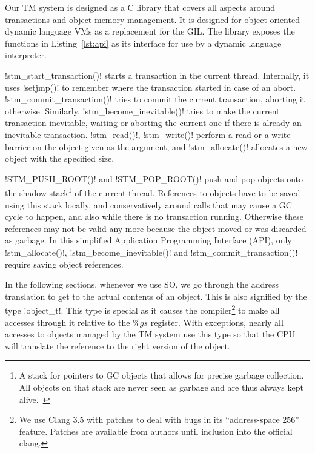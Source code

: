 \documentclass{sigplanconf}
\makeatletter
\renewcommand\lstinline[1][]{%
  \Collectverb{\@@myverb}%
}
\def\@@myverb#1{%
    \begingroup
    \fboxsep=0.2em
    \colorbox{verylightgray}{\oldlstinline|#1|}%
    \endgroup
}
\makeatother
\begin{document}
Our TM system is designed as a C library that covers all aspects around
transactions and object memory management. It is designed for
object-oriented dynamic language VMs as a replacement for the GIL.
The library exposes the functions in Listing~\ref{lst:api} as its
interface for use by a dynamic language interpreter.

\lstinline!stm_start_transaction()!  starts a transaction in the
current thread. Internally, it uses \lstinline!setjmp()! to remember
where the transaction started in case of an abort.
\lstinline!stm_commit_transaction()! tries to commit the current
transaction, aborting it otherwise. Similarly,
\lstinline!stm_become_inevitable()!  tries to make the current
transaction inevitable, waiting or aborting the current one if there
is already an inevitable transaction.
 \lstinline!stm_read()!, \lstinline!stm_write()!  perform
a read or a write barrier on the object given as the argument, and
\lstinline!stm_allocate()!  allocates a new object with the specified
size.

\lstinline!STM_PUSH_ROOT()! and \lstinline!STM_POP_ROOT()!
push and pop objects onto the shadow stack\footnote{A stack for pointers
  to GC objects that allows for precise garbage collection. All objects
  on that stack are never seen as garbage and are thus always kept
  alive.~\cite{fergus02}} of the current thread.  References to objects
have to be saved using this stack locally, and conservatively around calls that may cause a GC
cycle to happen, and also while there is no transaction
running. Otherwise these references may not be valid any more because
the object moved or was discarded as garbage. In this simplified Application
Programming Interface (API), only \lstinline!stm_allocate()!,
\lstinline!stm_become_inevitable()! and
\lstinline!stm_commit_transaction()!  require saving object
references.

In the following sections, whenever we use SO, we go through the
address translation to get to the actual contents of an object. This
is also signified by the type \lstinline!object_t!.  This type is
special as it causes the
compiler\footnote{We use Clang 3.5 with patches to deal with bugs in
its ``address-space 256'' feature. Patches are available from authors
until inclusion into the official clang.} to make all accesses through
it relative to the $\%gs$ register.  With exceptions, nearly all
accesses to objects managed by the TM system use this type so
that the CPU will translate the reference to the right version of the
object.
\medskip   %
\end{document}
